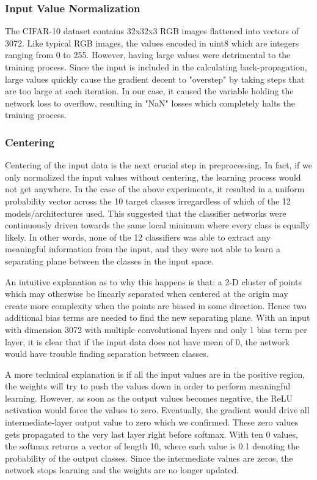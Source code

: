 \subsubsection{Input Value Normalization}
    The CIFAR-10 dataset contains 32x32x3 RGB images flattened into vectors of 3072. Like typical RGB images, the values encoded in uint8 which are integers ranging from 0 to 255. However, having large values were detrimental to the training process. Since the input is included in the calculating back-propagation, large values quickly cause the gradient decent to "overstep" by taking steps that are too large at each iteration. In our case, it caused the variable holding the network loss to overflow, resulting in "NaN" losses which completely halts the training process.
    
\subsubsection{Centering}
    Centering of the input data is the next crucial step in preprocessing. In fact, if we only normalized the input values without centering, the learning process would not get anywhere. In the case of the above experiments, it resulted in a uniform probability vector across the 10 target classes irregardless of which of the 12 models/architectures used. This suggested that the classifier networks were continuously driven towards the same local minimum where every class is equally likely. In other words, none of the 12 classifiers was able to extract any meaningful information from the input, and they were not able to learn a separating plane between the classes in the input space.
    
    An intuitive explanation as to why this happens is that: a 2-D cluster of points which may otherwise be linearly separated when centered at the origin may create more complexity when the points are biased in some direction. Hence two additional bias terms are needed to find the new separating plane. With an input with dimension 3072 with multiple convolutional layers and only 1 bias term per layer, it is clear that if the input data does not have mean of 0, the network would have trouble finding separation between classes.
    
    A more technical explanation is if all the input values are in the positive region, the weights will try to push the values down in order to perform meaningful learning. However, as soon as the output values becomes negative, the ReLU activation would force the values to zero. Eventually, the gradient would drive all intermediate-layer output value to zero which we confirmed. These zero values gets propagated to the very last layer right before softmax. With ten 0 values, the softmax returns a vector of length 10, where each value is 0.1 denoting the probability of the output classes. Since the intermediate values are zeros, the network stops learning and the weights are no longer updated.
    

